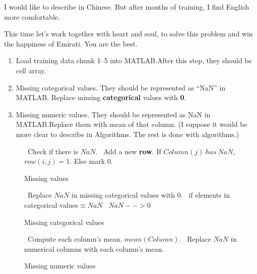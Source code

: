 \documentclass{article}
\begin{document}
I would like to describe in Chinese. But after months of training, I
find English more comfortable.
\par
This time let's work together with heart and soul, to solve this
problem and win the happiness of Emirati. You are the best.
\begin{enumerate}
\item Load training data chunk 1--5 into MATLAB.\@ After this step,
  they should be cell array.
\item Missing categorical values. They should be represented as
  ``NaN'' in MATLAB. Replace missing \textbf{categorical} values with
  \textbf{0}. 

\item Missing numeric values. They should be represented as NaN in
  MATLAB.\@ Replace them with mean of that column. (I suppose it would
  be more clear to describe in Algorithms. The rest is done with
  algorithms.)

\end{enumerate}


\begin{figure}[htbp]
  \centering
  \begin{algorithmic}[1]
    \STATE~Check if there is $NaN$.
    \STATE~Add a new \textbf{row}. If $Column(j)~has~NaN$,
    $row(i,j)=1$. Else mark $0$.
    \ENDFOR
  \end{algorithmic}
  \caption{Missing values}
\end{figure}



\begin{figure}[htbp]
  \centering


  \begin{algorithmic}[1]
    \STATE~Replace $NaN$ in missing categorical values with $0$. 
    \STATE~if elements in categorical values$ \equiv NaN$
    \STATE~$NaN --> 0$
    \ENDFOR
  \caption{Missing categorical values}
  \end{algorithmic}
\end{figure}

\begin{figure}[htbp]
  \centering
  \begin{algorithmic}[1]
    \STATE~Compute each column's mean. $mean(Column)$.
    \STATE~Replace $NaN$ in numerical columns with each column's mean.
  \end{algorithmic}


  \caption{Missing numeric values}
\end{figure}
\end{document}
